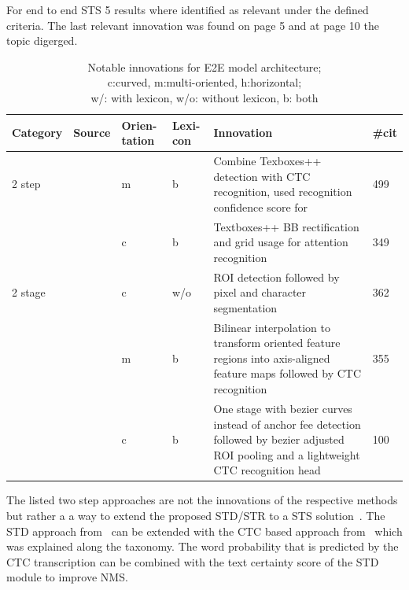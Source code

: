 For end to end \ac{STS} 5 results where identified as relevant under the defined criteria.
The last relevant innovation was found on page 5 and at page 10 the topic digerged.
\begin{table}[h]
    \centering\scriptsize
    \begin{tabular}{p{}p{}p{}p{}
            p{}p{}}
        Category & Source & Orien-tation & Lexi-con & Innovation & \#cit\\
        \toprule
        2 step &~\cite{liao_textboxes_2018} & m & b & Combine Texboxes++ detection with \ac{CTC}
            recognition, used recognition confidence score for & 499\\
            &~\cite{shi_aster_2019} & c & b & Textboxes++ \ac{BB} rectification and grid usage for
                attention recognition & 349 \\
        2 stage &~\cite{lyu_mask_2018} & c & w/o & \ac{ROI} detection followed by pixel and character
            segmentation & 362 \\
            &~\cite{liu_fots_2018} & m & b & Bilinear interpolation to transform oriented feature
                regions into axis-aligned feature maps followed by \ac{CTC} recognition & 355 \\
            &~\cite{liu_abcnet_2020} & c & b & One stage with bezier curves instead of anchor fee
                detection followed by bezier adjusted ROI pooling and a lightweight \ac{CTC}
                recognition head & 100 \\
        \bottomrule
    \end{tabular}
    \caption[Notable innovations for E2E model architecture]{%
        Notable innovations for E2E model architecture; \\
        c:curved, m:multi-oriented, h:horizontal; \\
        w/: with lexicon, w/o: without lexicon, b: both\label{tb:E2E-steps-properties}
    }
\end{table}
The listed two step approaches are not the innovations of the respective methods but rather a
a way to extend the proposed \ac{STD}/\ac{STR} to a \ac{STS}
solution~\citep{liao_textboxes_2018,shi_aster_2019}.
The \ac{STD} approach from~\cite{liao_textboxes_2018} can be extended with the \ac{CTC} based
approach from~\cite{shi_end--end_2017} which was explained along the taxonomy.
The word probability that is predicted by the \ac{CTC} transcription can be combined with the
text certainty score of the \ac{STD} module to improve \ac{NMS}.
